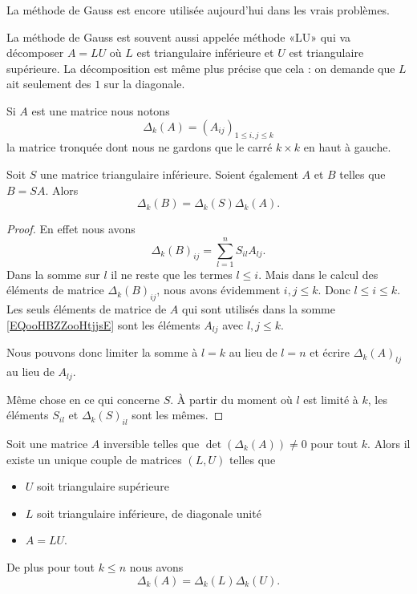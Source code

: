 La méthode de Gauss est encore utilisée aujourd'hui dans les vrais problèmes.

La méthode de Gauss est souvent aussi appelée méthode «LU» qui va décomposer \( A=LU\) où \( L\) est triangulaire inférieure et \( U\) est triangulaire supérieure. La décomposition est même plus précise que cela : on demande que \( L\) ait seulement des \( 1\) sur la diagonale.

Si \( A\) est une matrice nous notons
\begin{equation}
    \Delta_k(A)= (A_{ij})_{1\leq i,j\leq k}
\end{equation}
la matrice tronquée dont nous ne gardons que le carré \( k\times k\) en haut à gauche.

\begin{lemma}       \label{LEMooXEJFooGiYoyb}
    Soit \( S\) une matrice triangulaire inférieure. Soient également \( A\) et \( B\) telles que \( B=SA\). Alors
    \begin{equation}
        \Delta_k(B)=\Delta_k(S)\Delta_k(A).
    \end{equation}
\end{lemma}

\begin{proof}
     En effet nous avons
     \begin{equation}       \label{EQooHBZZooHtjjsE}
         \Delta_k(B)_{ij}=\sum_{l=1}^nS_{il}A_{lj}.
     \end{equation}
     Dans la somme sur \( l\) il ne reste que les termes \( l\leq i\). Mais dans le calcul des éléments de matrice \( \Delta_k(B)_{ij}\), nous avons évidemment \( i,j\leq k\). Donc \( l\leq i\leq k\). Les seuls éléments de matrice de \( A\) qui sont utilisés dans la somme \eqref{EQooHBZZooHtjjsE} sont les éléments \( A_{lj}\) avec \( l,j\leq k\).

     Nous pouvons donc limiter la somme à \( l=k\) au lieu de \( l=n\) et écrire \( \Delta_k(A)_{lj}\) au lieu de \( A_{lj}\).

     Même chose en ce qui concerne \( S\). À partir du moment où \( l\) est limité à \( k\), les éléments \( S_{il}\) et \( \Delta_k(S)_{il}\) sont les mêmes.
\end{proof}

\begin{theorem}       \label{THOooUXKJooYaPhiu}
    Soit une matrice \( A\) inversible telles que \( \det(\Delta_k(A))\neq 0\) pour tout \( k\). Alors il existe un unique couple de matrices \( (L,U)\) telles que
    \begin{itemize}
        \item \( U\) soit triangulaire supérieure
        \item \( L\) soit triangulaire inférieure, de diagonale unité
        \item \( A=LU\).
    \end{itemize}
    De plus pour tout \( k\leq n\) nous avons
    \begin{equation}
        \Delta_k(A)=\Delta_k(L)\Delta_k(U).
    \end{equation}
\end{theorem}

